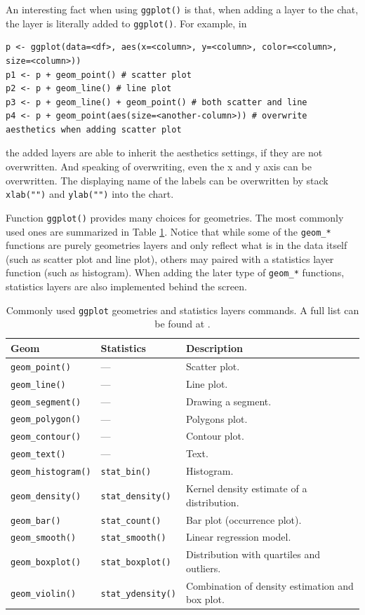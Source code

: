 An interesting fact when using \verb|ggplot()| is that, when adding a layer to the chat, the layer is literally added to \verb|ggplot()|. For example, in
\begin{lstlisting}
p <- ggplot(data=<df>, aes(x=<column>, y=<column>, color=<column>, size=<column>))
p1 <- p + geom_point() # scatter plot
p2 <- p + geom_line() # line plot
p3 <- p + geom_line() + geom_point() # both scatter and line
p4 <- p + geom_point(aes(size=<another-column>)) # overwrite aesthetics when adding scatter plot
\end{lstlisting}
the added layers are able to inherit the aesthetics settings, if they are not overwritten. And speaking of overwriting, even the x and y axis can be overwritten. The displaying name of the labels can be overwritten by stack \verb|xlab("")| and \verb|ylab("")| into the chart.

Function \verb|ggplot()| provides many choices for geometries. The most commonly used ones are summarized in Table \ref{ch:r1:tab:geoms}. Notice that while some of the \verb|geom_*| functions are purely geometries layers and only reflect what is in the data itself (such as scatter plot and line plot), others may paired with a statistics layer function (such as histogram). When adding the later type of \verb|geom_*| functions, statistics layers are also implemented behind the screen.

\begin{table}[!htb]
  \centering \caption{Commonly used \texttt{ggplot} geometries and statistics layers commands. A full list can be found at \cite{ggplot2025package}.}\label{ch:r1:tab:geoms}
  \begin{tabularx}{\textwidth}{llX}
    \hline
    \textbf{Geom} & \textbf{Statistics} & \textbf{Description} \\ \hline
	\texttt{geom\_point()} & --- & Scatter plot. \\
	\texttt{geom\_line()} & --- & Line plot. \\
	\texttt{geom\_segment()} & --- & Drawing a segment. \\
	\texttt{geom\_polygon()} & --- & Polygons plot. \\
	\texttt{geom\_contour()} & --- & Contour plot. \\
	\texttt{geom\_text()} & --- & Text. \\ \hline
	\texttt{geom\_histogram()} & \texttt{stat\_bin()} & Histogram. \\
	\texttt{geom\_density()} & \texttt{stat\_density()} & Kernel density estimate of a distribution. \\
	\texttt{geom\_bar()} & \texttt{stat\_count()} & Bar plot (occurrence plot). \\
	\texttt{geom\_smooth()} & \texttt{stat\_smooth()} & Linear regression model. \\
	\texttt{geom\_boxplot()} & \texttt{stat\_boxplot()} & Distribution with quartiles and outliers. \\
	\texttt{geom\_violin()} & \texttt{stat\_ydensity()} & Combination of density estimation and box plot. \\
	\hline
    \end{tabularx}
\end{table}

